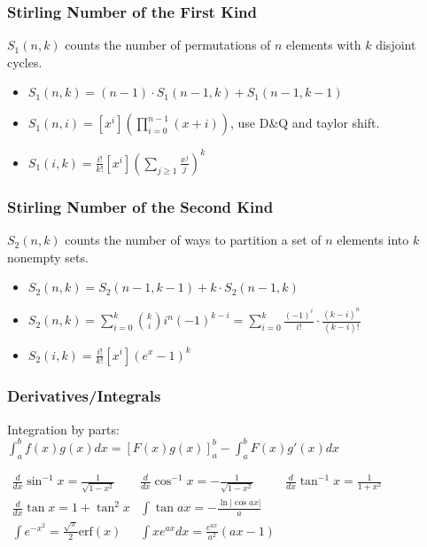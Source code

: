 \subsubsection{Stirling Number of the First Kind}
$S_1(n, k)$ counts the number of permutations of $n$ elements with $k$ disjoint cycles.
\begin{itemize}
  \item
    $S_1(n, k) = (n - 1) \cdot S_1(n - 1, k) + S_1(n - 1, k - 1)$
  \item
    $S_1(n, i) = [x^i] \left(\prod _ {i=0} ^ {n-1} (x + i)\right)$,
    use D\&Q and taylor shift.
  \item
    \(
    S_1(i, k) = \frac{i!}{k!} \left[x^i\right] 
    \left(\sum _ {j \ge 1} \frac{x^j}{j}\right)^k
    \)
\end{itemize}

\subsubsection{Stirling Number of the Second Kind}
$S_2(n, k)$ counts the number of ways to partition a set of $n$ elements into $k$ nonempty sets.
\begin{itemize}
  \item $S_2(n, k) = S_2(n - 1, k - 1) + k \cdot S_2(n - 1, k)$
  \item
    \(
    S_2(n, k) = \sum_{i = 0}^k \binom{k}{i}i^n (-1)^{k - i} = \sum_{i = 0}^k \frac{(-1)^i}{i!} \cdot \frac{(k - i)^n}{(k - i)!}
    \)
  \item
    \(
    S_2(i, k) = \frac{i!}{k!} [x^i] \left(e^x - 1\right)^k
    \)
\end{itemize}

\subsubsection{Derivatives/Integrals}
Integration by parts:
\(\int_a^bf(x)g(x)dx = [F(x)g(x)]_a^b-\int_a^bF(x)g'(x)dx\)
{

  \noindent
  \(
  \begin{aligned}
    \frac{d}{dx}\sin^{-1} x = \frac{1}{\sqrt{1-x^2}}
    &
    \frac{d}{dx}\cos^{-1} x = -\frac{1}{\sqrt{1-x^2}}
    &
    \frac{d}{dx}\tan^{-1} x = \frac{1}{1+x^2}
    \\
    \frac{d}{dx}\tan x = 1+\tan^2 x
    &
    \int\tan ax = -\frac{\ln|\cos ax|}{a}
    &
    \\
    \int e^{-x^2} = \frac{\sqrt \pi}{2} \text{erf}(x)
    &
    \int xe^{ax}dx = \frac{e^{ax}}{a^2}(ax-1)
    \\
  \end{aligned}
  \)
}

